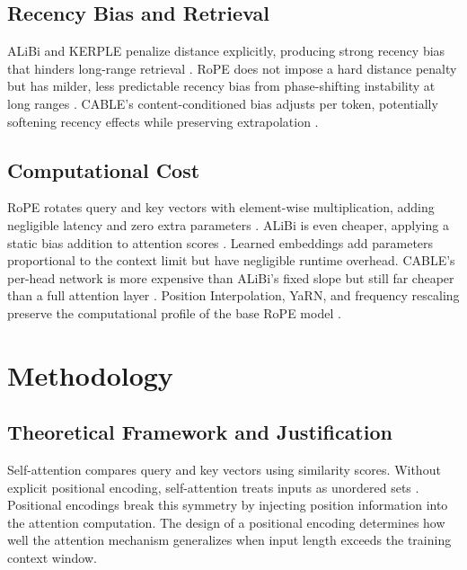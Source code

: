 \documentclass[conference]{IEEEtran}
\begin{document}
\subsection{Recency Bias and Retrieval}

ALiBi and KERPLE penalize distance explicitly, producing strong recency bias that hinders long-range retrieval \cite{press2022,chi2022}. RoPE does not impose a hard distance penalty but has milder, less predictable recency bias from phase-shifting instability at long ranges \cite{su2024roformer,sun2022lex}. CABLE's content-conditioned bias adjusts per token, potentially softening recency effects while preserving extrapolation \cite{veisi2025cable}.

\subsection{Computational Cost}

RoPE rotates query and key vectors with element-wise multiplication, adding negligible latency and zero extra parameters \cite{su2024roformer}. ALiBi is even cheaper, applying a static bias addition to attention scores \cite{press2022}. Learned embeddings add parameters proportional to the context limit but have negligible runtime overhead. CABLE's per-head network is more expensive than ALiBi's fixed slope but still far cheaper than a full attention layer \cite{veisi2025cable}. Position Interpolation, YaRN, and frequency rescaling preserve the computational profile of the base RoPE model \cite{chen2023,peng2023yarn,liu2024scaling}.

\section{Methodology}
\label{sec:methodology}

\subsection{Theoretical Framework and Justification}

Self-attention compares query and key vectors using similarity scores. Without explicit positional encoding, self-attention treats inputs as unordered sets \cite{vaswani2017}. Positional encodings break this symmetry by injecting position information into the attention computation. The design of a positional encoding determines how well the attention mechanism generalizes when input length exceeds the training context window.
\end{document}
